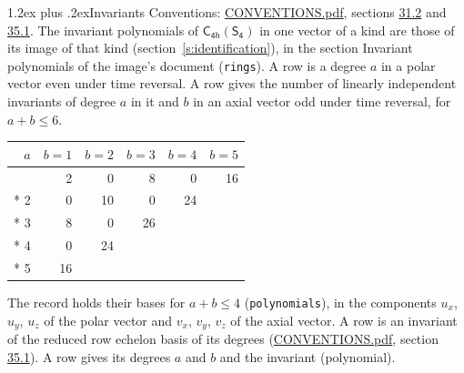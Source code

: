 \documentclass[10pt,a4paper]{article}
\makeatletter
\renewcommand\section{\@startsection{section}{1}{\z@}{-3ex plus -1ex minus -.2ex}%
  {1.2ex plus .2ex}{\normalfont\large\sffamily\bfseries\color{parttitle}}}
\numberwithin{equation}{section}
\newcommand{\grp}[1]{\mathsf{#1}}
\makeatother
\begin{document}
\section{Invariants}\label{s:invariants}
Conventions: \href{../../CONVENTIONS.pdf}{CONVENTIONS.pdf}, sections \href{../../CONVENTIONS.pdf\#conv.31.2}{31.2} and \href{../../CONVENTIONS.pdf\#conv.35.1}{35.1}.
The invariant polynomials of $\grp{C_{4h}}(\grp{S_{4}})$ in one vector of a kind are those of its image of that kind (section~\ref{s:identification}), in the section Invariant polynomials of the image's document (\texttt{rings}).
\leavevmode\label{n:index.degree.polar}\label{n:index.degree.axial}A row is a degree $a$ in a polar vector even under time reversal. A row gives the number of linearly independent invariants of degree $a$ in it and $b$ in an axial vector odd under time reversal, for $a + b \le 6$.
{\small\begin{longtable}{@{}rrrrrr@{}}\toprule
$a$ & $b = 1$ & $b = 2$ & $b = 3$ & $b = 4$ & $b = 5$\\\midrule\endhead
\bottomrule\endfoot\endlastfoot
1 & 2 & 0 & 8 & 0 & 16\\*
2 & 0 & 10 & 0 & 24 & \\*
3 & 8 & 0 & 26 &  & \\*
4 & 0 & 24 &  &  & \\*
5 & 16 &  &  &  & \\
\bottomrule\end{longtable}}
\leavevmode\label{n:local.component.polar}\label{n:local.component.axial}The record holds their bases for $a + b \le 4$ (\texttt{polynomials}), in the components $u_{x}$, $u_{y}$, $u_{z}$ of the polar vector and $v_{x}$, $v_{y}$, $v_{z}$ of the axial vector. \label{n:head.polynomial}A row is an invariant of the reduced row echelon basis of its degrees (\href{../../CONVENTIONS.pdf}{CONVENTIONS.pdf}, section \href{../../CONVENTIONS.pdf\#conv.35.1}{35.1}). A row gives its degrees $a$ and $b$ and the invariant (polynomial).
\end{document}
